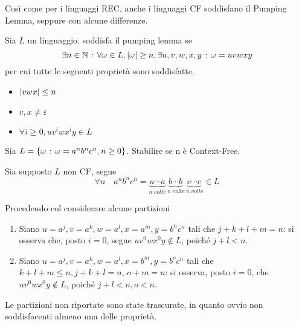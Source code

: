 \documentclass{subfiles}
\begin{document}
\label{sec:6.5}
Così come per i linguaggi REC, anche i linguaggi CF soddisfano il Pumping Lemma, seppure con alcune differenze.
\begin{Lemma}
    \noindent Sia \(L\) un linguaggio. soddisfa il pumping lemma se
    \[
        \exists n \in \mathbb{N} \operatorname{\: {:} \:} \forall \omega \in L, \abs{\omega} \ge n, \exists u,v,w,x,y \operatorname{\: {:} \:} \omega = uvwxy
    \]
    per cui tutte le seguenti proprietà sono soddisfatte.
    \begin{multicols}{3}
        \begin{itemize}
            \item \(\abs{vwx} \le n\)
            \item \(v,x \neq \varepsilon\)
            \item \(\forall i \ge 0 , uv^{i}wx^{i}y \in L\)
        \end{itemize}
    \end{multicols}
\end{Lemma}

\begin{Exercise*}
    Sia \(L = \left\{\omega \operatorname{\: {:} \:} \omega = a^{n}b^{n}c^{n}, n \ge 0\right\}\). Stabilire se n è Context-Free.
    \begin{Solution*}
        Sia supposto \(L\) non CF, segue
        \[
            \forall n \quad a^{n}b^{n}c^{n} = \underbrace{a \cdots a}_{n \ volte} \underbrace{b \cdots b}_{\ n \ volte} \underbrace{c \cdots c}_{\ n \ volte} \in L
        \]

        \noindent Procedendo col considerare alcune partizioni
        \begin{enumerate}
            \item Siano \(u = a^{j}, v = a^{k}, w = a^{l}, x = a^{m}, y = b^{n}c^{n}\) tali che \(j + k + l + m = n\):
                  si osserva che, posto \(i = 0\), segue \(uv^{0}wx^{0}y \notin L\), poiché \(j + l < n\).

            \item Siano \(u = a^{j}, v = a^{k}, w = a^{l}, x = b^{m}, y = b^{o}c^{n}\) tali che \(k + l + m \le n, j + k + l = n\), \( o + m = n\):
                  si osserva, posto \(i = 0\), che \(uv^{0}wx^{0}y \notin L\), poiché \(j +l < n, o < n\).
        \end{enumerate}

        \begin{Note*}
            Le partizioni non riportate sono state trascurate, in quanto ovvio non soddisfacenti almeno una delle proprietà.
        \end{Note*}
    \end{Solution*}
\end{Exercise*}
\clearpage
\end{document}
